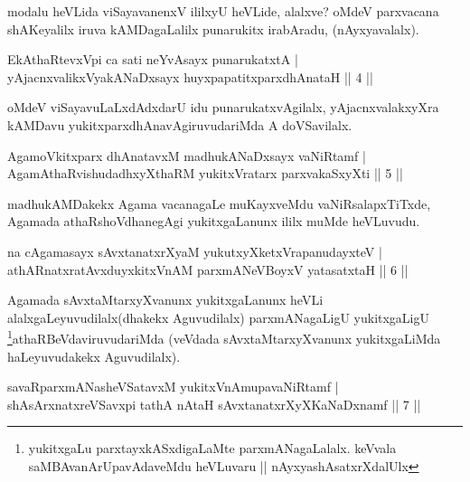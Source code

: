 \begin{artha}
modalu heVLida viSayavanenxV ililxyU heVLide, alalxve? oMdeV parxvacana shAKeyalilx iruva kAMDagaLalilx punarukitx irabAradu, (nAyxyavalalx).
\end{artha}


\begin{shl}
EkAthaRtevxV\s pi ca sati neYvAsayx punarukatxtA |\\
yAjacnxvalikxVyakANaDxsayx huyxpapatitxparxdhAnataH \hfill || 4 ||
\end{shl}

\begin{artha}
oMdeV viSayavuLaLxdAdxdarU idu punarukatxvAgilalx, yAjacnxvalakxyXra kAMDavu yukitxparxdhAnavAgiruvudariMda A doVSavilalx.
\end{artha}

\begin{shl}
AgamoVkitxparx dhAnatavxM madhukANaDxsayx vaNiRtamf |\\
AgamAthaRvishudadhxyXthaRM yukitxVratarx parxvakaSxyXti \hfill || 5 ||
\end{shl}

\begin{artha}
madhukAMDakekx Agama vacanagaLe muKayxveMdu vaNiRsalapxTiTxde, Agamada athaRshoVdhanegAgi yukitxgaLanunx ililx muMde heVLuvudu.
\end{artha}


\begin{shl}
na cA\s \s gamasayx sAvxtanatxrXyaM yukutxyXketxVrapanudayxteV |\\
athARnatxratAvxduyxkitxVnAM parxmANeVBoyxV yatasatxtaH \hfill || 6 ||
\end{shl}

\begin{artha}
Agamada sAvxtaMtarxyXvanunx yukitxgaLanunx heVLi alalxgaLeyuvudilalx(dhakekx Aguvudilalx) parxmANagaLigU yukitxgaLigU \footnote{yukitxgaLu parxtayxkASxdigaLaMte parxmANagaLalalx. keVvala saMBAvanArUpavAdaveMdu heVLuvaru || nAyxyashAsatxrXdalUlx}athaRBeVdaviruvudariMda (veVdada sAvxtaMtarxyXvanunx yukitxgaLiMda haLeyuvudakekx Aguvudilalx).
\end{artha}


\begin{shl}
savaRparxmANasheVSatavxM yukitxVnAmupavaNiRtamf |\\
shAsArxnatxreVSavxpi tathA nAtaH sAvxtanatxrXyXKaNaDxnamf \hfill || 7 ||
\end{shl}

